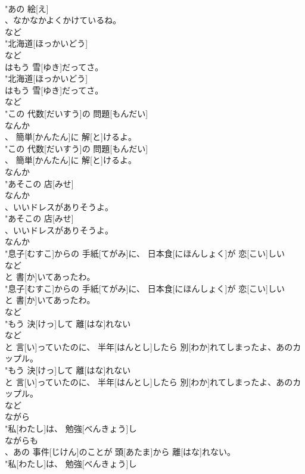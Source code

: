 \documentclass[8pt]{extreport}
\begin{document}
\begin{CJK}{UTF8}{min}
\\	"あの 絵[え]
\\	、なかなかよくかけているね。
\\	など
\\	"北海道[ほっかいどう]
\\	など
\\	はもう 雪[ゆき]だってさ。
\\	"北海道[ほっかいどう]
\\	はもう 雪[ゆき]だってさ。
\\	など
\\	"この 代数[だいすう]の 問題[もんだい]
\\	なんか
\\	、 簡単[かんたん]に 解[と]けるよ。
\\	"この 代数[だいすう]の 問題[もんだい]
\\	、 簡単[かんたん]に 解[と]けるよ。
\\	なんか
\\	"あそこの 店[みせ]
\\	なんか
\\	、いいドレスがありそうよ。
\\	"あそこの 店[みせ]
\\	、いいドレスがありそうよ。
\\	なんか
\\	"息子[むすこ]からの 手紙[てがみ]に、 日本食[にほんしょく]が 恋[こい]しい
\\	など
\\	と 書[か]いてあったわ。
\\	"息子[むすこ]からの 手紙[てがみ]に、 日本食[にほんしょく]が 恋[こい]しい
\\	と 書[か]いてあったわ。
\\	など
\\	"もう 決[けっ]して 離[はな]れない
\\	など
\\	と 言[い]っていたのに、 半年[はんとし]したら 別[わか]れてしまったよ、あのカップル。
\\	"もう 決[けっ]して 離[はな]れない
\\	と 言[い]っていたのに、 半年[はんとし]したら 別[わか]れてしまったよ、あのカップル。
\\	など
\\	ながら 
\\	"私[わたし]は、 勉強[べんきょう]し
\\	ながらも
\\	、あの 事件[じけん]のことが 頭[あたま]から 離[はな]れない。
\\	"私[わたし]は、 勉強[べんきょう]し

\end{CJK}
\end{document}
